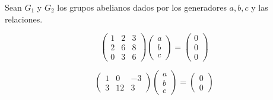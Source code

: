 \question
Sean $G_1$ y $G_2$ los grupos abelianos dados por los generadores $a,b,c$ y 
las relaciones.

\begin{equation}
\begin{pmatrix}
1 & 2 & 3 \\
2 & 6 & 8 \\
0 & 3 & 6
\end{pmatrix}
\begin{pmatrix}
a \\
b \\
c
\end{pmatrix}
=
\begin{pmatrix}
0 \\
0 \\
0
\end{pmatrix}
\end{equation}

\begin{equation}
\begin{pmatrix}
1 & 0 & -3 \\
3 & 12 & 3
\end{pmatrix}
\begin{pmatrix}
a \\
b \\
c
\end{pmatrix}
=
\begin{pmatrix}
0 \\
0
\end{pmatrix}
\end{equation}

